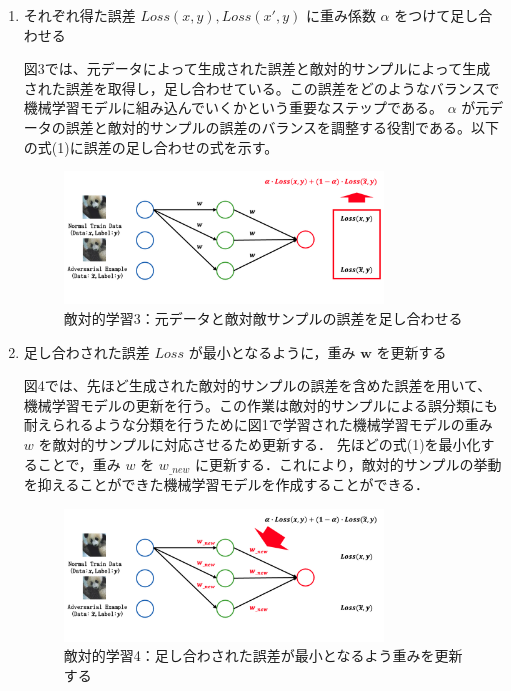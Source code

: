 \begin{enumerate}
    \item それぞれ得た誤差 $Loss(x, y), Loss(x', y)$ に重み係数 $\alpha$ をつけて足し合わせる

    図3では、元データによって生成された誤差と敵対的サンプルによって生成された誤差を取得し，足し合わせている。この誤差をどのようなバランスで機械学習モデルに組み込んでいくかという重要なステップである。 $\alpha$ が元データの誤差と敵対的サンプルの誤差のバランスを調整する役割である。以下の式(1)に誤差の足し合わせの式を示す。
    \begin{figure}[H]
        \centering
        \includegraphics[width=0.8\textwidth]{images/敵対的学習3.png}
        \caption{敵対的学習3：元データと敵対敵サンプルの誤差を足し合わせる}
        \label{fig:adversarial_learning3}
    \end{figure}

    \item 足し合わされた誤差 $Loss$ が最小となるように，重み $\bm{w}$ を更新する

    図4では、先ほど生成された敵対的サンプルの誤差を含めた誤差を用いて、機械学習モデルの更新を行う。この作業は敵対的サンプルによる誤分類にも耐えられるような分類を行うために図1で学習された機械学習モデルの重み $w$ を敵対的サンプルに対応させるため更新する．
    先ほどの式(1)を最小化することで，重み $w$ を $w_{\_new}$ に更新する．これにより，敵対的サンプルの挙動を抑えることができた機械学習モデルを作成することができる．
    
    \begin{figure}[H]
        \centering
        \includegraphics[width=0.8\textwidth]{images/敵対的学習4.png}
        \caption{敵対的学習4：足し合わされた誤差が最小となるよう重みを更新する}
        \label{fig:adversarial_learning4}
    \end{figure}

\end{enumerate}

